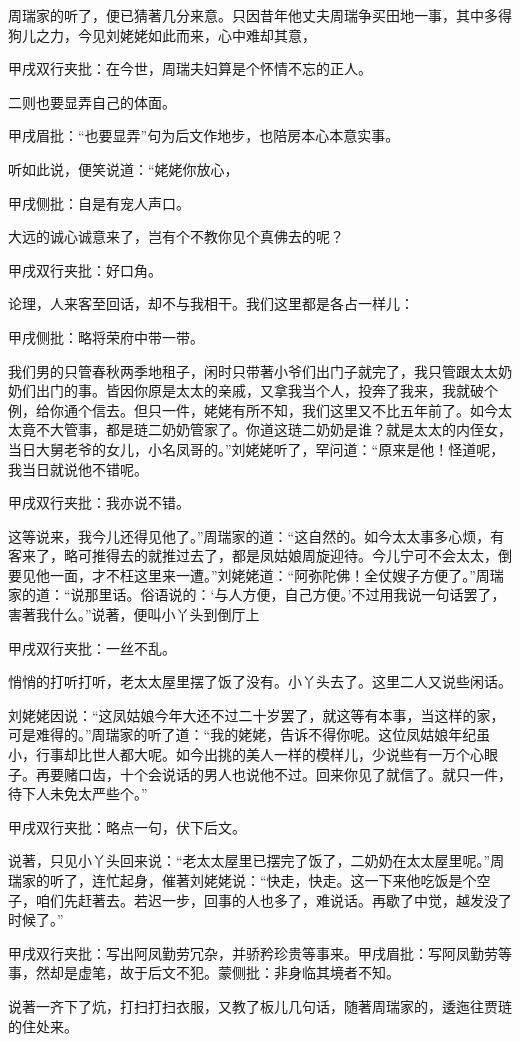 \begin{parag}


    周瑞家的听了，便已猜著几分来意。只因昔年他丈夫周瑞争买田地一事，其中多得狗儿之力，今见刘姥姥如此而来，心中难却其意，\begin{note}甲戌双行夹批：在今世，周瑞夫妇算是个怀情不忘的正人。\end{note}二则也要显弄自己的体面。\begin{note}甲戌眉批：“也要显弄”句为后文作地步，也陪房本心本意实事。\end{note}听如此说，便笑说道：“姥姥你放心，\begin{note}甲戌侧批：自是有宠人声口。\end{note}大远的诚心诚意来了，岂有个不教你见个真佛去的呢？\begin{note}甲戌双行夹批：好口角。\end{note}论理，人来客至回话，却不与我相干。我们这里都是各占一样儿：\begin{note}甲戌侧批：略将荣府中带一带。\end{note}我们男的只管春秋两季地租子，闲时只带著小爷们出门子就完了，我只管跟太太奶奶们出门的事。皆因你原是太太的亲戚，又拿我当个人，投奔了我来，我就破个例，给你通个信去。但只一件，姥姥有所不知，我们这里又不比五年前了。如今太太竟不大管事，都是琏二奶奶管家了。你道这琏二奶奶是谁？就是太太的内侄女，当日大舅老爷的女儿，小名凤哥的。”刘姥姥听了，罕问道：“原来是他！怪道呢，我当日就说他不错呢。\begin{note}甲戌双行夹批：我亦说不错。\end{note}这等说来，我今儿还得见他了。”周瑞家的道：“这自然的。如今太太事多心烦，有客来了，略可推得去的就推过去了，都是凤姑娘周旋迎待。今儿宁可不会太太，倒要见他一面，才不枉这里来一遭。”刘姥姥道：“阿弥陀佛！全仗嫂子方便了。”周瑞家的道：“说那里话。俗语说的：‘与人方便，自己方便。’不过用我说一句话罢了，害著我什么。”说著，便叫小丫头到倒厅上\begin{note}甲戌双行夹批：一丝不乱。\end{note}悄悄的打听打听，老太太屋里摆了饭了没有。小丫头去了。这里二人又说些闲话。
\end{parag}


\begin{parag}

    刘姥姥因说：“这凤姑娘今年大还不过二十岁罢了，就这等有本事，当这样的家，可是难得的。”周瑞家的听了道：“我的姥姥，告诉不得你呢。这位凤姑娘年纪虽小，行事却比世人都大呢。如今出挑的美人一样的模样儿，少说些有一万个心眼子。再要赌口齿，十个会说话的男人也说他不过。回来你见了就信了。就只一件，待下人未免太严些个。”\begin{note}甲戌双行夹批：略点一句，伏下后文。\end{note}说著，只见小丫头回来说：“老太太屋里已摆完了饭了，二奶奶在太太屋里呢。”周瑞家的听了，连忙起身，催著刘姥姥说：“快走，快走。这一下来他吃饭是个空子，咱们先赶著去。若迟一步，回事的人也多了，难说话。再歇了中觉，越发没了时候了。”\begin{note}甲戌双行夹批：写出阿凤勤劳冗杂，并骄矜珍贵等事来。甲戌眉批：写阿凤勤劳等事，然却是虚笔，故于后文不犯。蒙侧批：非身临其境者不知。\end{note}说著一齐下了炕，打扫打扫衣服，又教了板儿几句话，随著周瑞家的，逶迤往贾琏的住处来。
\end{parag}


